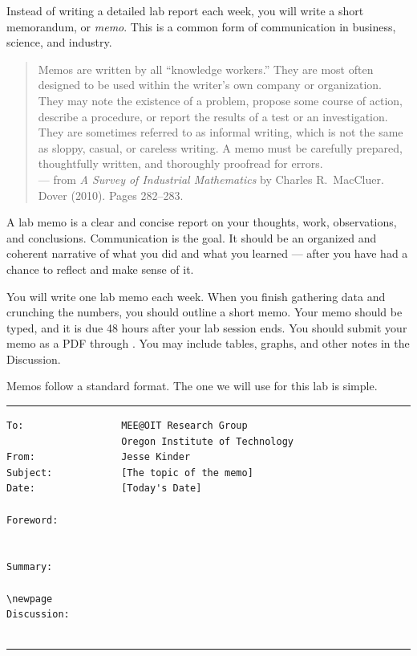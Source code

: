 Instead of writing a detailed lab report each week, you will write a short memorandum, or \emph{memo}.  This is a common form of communication in business, science, and industry.

\begin{quote}
Memos are written by all ``knowledge workers.'' They are most often designed to be used within the writer's own company or organization.  They may note the existence of a problem, propose some course of action, describe a procedure, or report the results of a test or an investigation.  They are sometimes referred to as informal writing, which is not the same as sloppy, casual, or careless writing.  A memo must be carefully prepared, thoughtfully written, and thoroughly proofread for errors. \\
\hfill --- from \emph{A Survey of Industrial Mathematics} by Charles R.\ MacCluer.  Dover (2010).  Pages 282--283.
\end{quote}

A lab memo is a clear and concise report on your thoughts, work, observations, and conclusions.  Communication is the goal.  It should be an organized and coherent narrative of what you did and what you learned --- after you have had a chance to reflect and make sense of it.

You will write one lab memo each week.  When you finish gathering data and crunching the numbers, you should outline a short memo.  Your memo should be typed, and it is due 48 hours after your lab session ends. You should submit your memo as a PDF through \HomeworkSubmission.  You may include tables, graphs, and other notes in the Discussion.

Memos follow a standard format.  The one we will use for this lab is simple.

\newpage
\noindent\rule{\textwidth}{2px}
\begin{verbatim}
To:                 MEE@OIT Research Group
                    Oregon Institute of Technology
From:               Jesse Kinder
Subject:            [The topic of the memo]
Date:               [Today's Date]

Foreword:


Summary:

\newpage
Discussion:


\end{verbatim}
\noindent\rule{\textwidth}{2px}
\vfill

